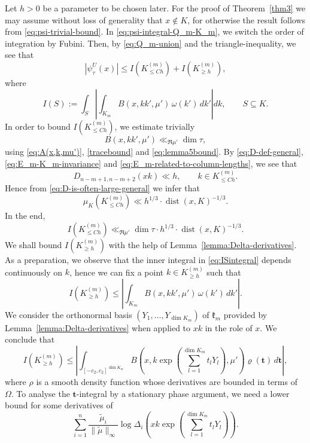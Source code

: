 \documentclass[11pt,oneside]{amsart}
\numberwithin{equation}{section}
\theoremstyle{remark}
\theoremstyle{plain}
\DeclareMathOperator{\dist}{dist}
\newcommand\mfk{\mathfrak{k}}
\newcommand{\bt}{\mathbf{t}}
\renewcommand\leq{\leqslant}
\renewcommand\geq{\geqslant}
\begin{document}
Let $h>0$ be a parameter to be chosen later. For the proof of Theorem~\ref{thm3} we may assume without loss of generality that $x \not\in K$, for otherwise the result follows from \eqref{eq:psi-trivial-bound}. In \eqref{eq:psi-integral-Q_m-K_m}, we switch the order of integration by Fubini. Then, by \eqref{eq:Q_m-union} and the triangle-inequality, we see that
\begin{equation}\label{eq:stationary-phase-splitted}
\left|\psi_\tau^{U}(x)\right| \leq I\left(K^{(m)}_{\leq Ch}\right) + I\left(K^{(m)}_{\geq h}\right),
\end{equation}
where 
\begin{equation}\label{eq:ISintegral}
I(S):= \int_S \left|\int_{K_m} B(x,kk',\mu')\,\omega(k')\,dk'\right| dk,\qquad S\subseteq K.
\end{equation}
In order to bound $I\left(K^{(m)}_{\leq Ch}\right)$, we estimate trivially
\[
B(x,kk',\mu') \ll_{\Re \mu'} \dim\tau,
\]
using \eqref{eq:A(x,k,mu')}, \eqref{tracebound} and \eqref{eq:lemma5bound}. By \eqref{eq:D-def-general}, \eqref{eq:E_m-K_m-invariance} and \eqref{eq:E_m-related-to-column-lengths}, we see that
\[
D_{n-m+1,n-m+2}(xk) \ll h,\qquad k\in K^{(m)}_{\leq Ch}.
\]
Hence from \eqref{eq:D-is-often-large-general} we infer that
\[
\mu_{K} \left( K^{(m)}_{\leq Ch} \right) \ll h^{1/3}\cdot \dist(x,K)^{-1/3}.
\]
In the end,
\begin{equation}\label{eq:I-E-small}
I\left(K^{(m)}_{\leq Ch}\right) \ll_{\Re \mu'} \dim \tau \cdot 
h^{1/3} \cdot \dist(x,K)^{-1/3}.
\end{equation}
We shall bound $I\left(K^{(m)}_{\geq h}\right)$ with the help of Lemma~\ref{lemma:Delta-derivatives}. As a preparation, we observe that the inner integral in \eqref{eq:ISintegral} depends continuously on $k$, hence we can fix a point $k\in K^{(m)}_{\geq h}$ such that
\[I\left(K^{(m)}_{\geq h}\right)\leq\left|\int_{K_m} B(x,kk',\mu')\,\omega(k')\,dk'\right|.\]
We consider the orthonormal basis $(Y_1,\dotsc,Y_{\dim K_{m}})$ of $\mfk_{m}$ provided by Lemma~\ref{lemma:Delta-derivatives} when applied to $xk$ in the role of $x$. We conclude that
\[
I\left(K^{(m)}_{\geq h}\right) \leq
\left|\int_{[-c_2,c_2]^{\dim K_m}} B\left(x,k\exp\left(\sum_{l=1}^{\dim K_{m}} t_l Y_l\right),\mu'\right)\varrho(\bt) \,d\bt \right|,
\]
where $\rho$ is a smooth density function whose derivatives are bounded in terms of $\Omega$. To analyse the $\bt$-integral by a stationary phase argument, we need a lower bound for some derivatives of 
\[\sum_{i=1}^n \frac{\tilde{\mu}_i}{\|\tilde{\mu}\|_{\infty}}
\log \Delta_i\left(xk\exp\left(\sum_{l=1}^{\dim K_{m}} t_l Y_l\right)\right).\]
\end{document}
